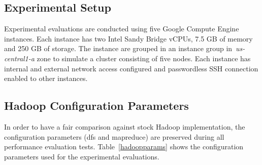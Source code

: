 \documentclass[preprint,12pt]{elsarticle}
\begin{document}
\subsection{Experimental Setup}
Experimental evaluations are conducted using five Google Compute Engine~\cite{gce}
instances. Each instance has two Intel Sandy Bridge vCPUs, 7.5 GB of memory and 250 GB
of storage. The instance are grouped in an instance group in~\textit{us-central1-a} zone
to simulate a cluster consisting of five nodes. Each instance has internal and external
network access configured and passwordless SSH connection enabled to other instances.

\subsection{Hadoop Configuration Parameters}
\label{hadoopconfs}
In order to have a fair comparison against stock Hadoop implementation, the configuration
parameters (dfs and mapreduce) are preserved during all performance evaluation tests.
Table~\ref{hadoopparams} shows the configuration parameters used for the experimental evaluations.

\begin{table}[!htbp]
 \begin{center}
 \end{center}
 \caption{Hadoop Configuration Parameters}
 \label{hadoopparams}
\end{table}
\end{document}
